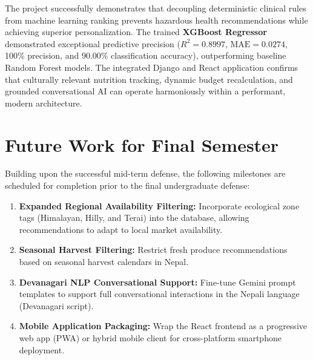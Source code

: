 \documentclass[12pt,a4paper]{report}
\begin{document}
The project successfully demonstrates that decoupling deterministic clinical rules from machine learning ranking prevents hazardous health recommendations while achieving superior personalization. The trained \textbf{XGBoost Regressor} demonstrated exceptional predictive precision ($R^2 = 0.8997$, $\text{MAE} = 0.0274$, 100\% precision, and 90.00\% classification accuracy), outperforming baseline Random Forest models. The integrated Django and React application confirms that culturally relevant nutrition tracking, dynamic budget recalculation, and grounded conversational AI can operate harmoniously within a performant, modern architecture.

\section{Future Work for Final Semester}

Building upon the successful mid-term defense, the following milestones are scheduled for completion prior to the final undergraduate defense:
\begin{enumerate}[leftmargin=*]
  \item \textbf{Expanded Regional Availability Filtering:} Incorporate ecological zone tags (Himalayan, Hilly, and Terai) into the database, allowing recommendations to adapt to local market availability.
  \item \textbf{Seasonal Harvest Filtering:} Restrict fresh produce recommendations based on seasonal harvest calendars in Nepal.
  \item \textbf{Devanagari NLP Conversational Support:} Fine-tune Gemini prompt templates to support full conversational interactions in the Nepali language (Devanagari script).
  \item \textbf{Mobile Application Packaging:} Wrap the React frontend as a progressive web app (PWA) or hybrid mobile client for cross-platform smartphone deployment.
\end{enumerate}
\end{document}
